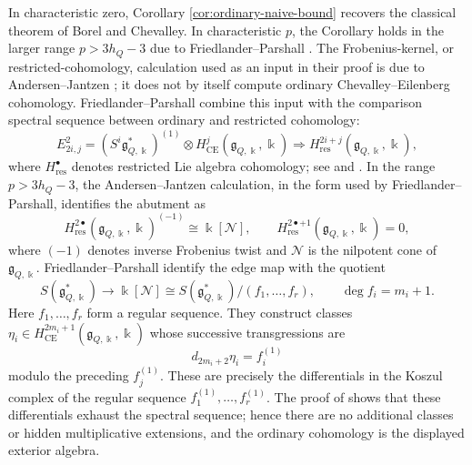 \documentclass[12pt]{amsart}
\theoremstyle{remark}
\newcommand{\kk}{\Bbbk}
\newcommand{\g}{\mathfrak g}
\newcommand{\CE}{\mathrm{CE}}
\begin{document}
In characteristic zero, Corollary 
\ref{cor:ordinary-naive-bound} recovers the classical theorem of Borel and Chevalley.
In characteristic $p$, the Corollary holds in the larger range $p>3h_Q-3$ due to
Friedlander--Parshall \cite[Theorem~1.2]{FP86}. The
Frobenius-kernel, or restricted-cohomology, calculation used as an input in
their proof is due to Andersen--Jantzen
\cite[Corollary~3.7]{AJ84}; it does not by itself compute ordinary
Chevalley--Eilenberg cohomology.  Friedlander--Parshall combine this input
with the comparison spectral sequence between ordinary and restricted
cohomology:
\[
 E^2_{2i,j}=(S^i\g_{Q,\kk}^*)^{(1)}
 \otimes H^j_{\CE}(\g_{Q,\kk},\kk)
 \Longrightarrow H^{2i+j}_{\mathrm{res}}(\g_{Q,\kk},\kk),
\]
where $H^\bullet_{\mathrm{res}}$ denotes restricted Lie algebra cohomology; see \cite[p.~1079]{FP88} and \cite[p.~114]{Far91}.
In the range $p>3h_Q-3$, the Andersen--Jantzen calculation, in the form used
by Friedlander--Parshall, identifies the abutment as
\[
 H^{2\bullet}_{\mathrm{res}}(\g_{Q,\kk},\kk)^{(-1)}
 \cong\kk[\mathcal N],
 \qquad H^{2\bullet+1}_{\mathrm{res}}(\g_{Q,\kk},\kk)=0,
\]
where $(-1)$ denotes inverse Frobenius twist and $\mathcal N$ is the nilpotent cone of $\g_{Q,\kk}$.
Friedlander--Parshall identify the edge map with the quotient
\[
 S(\g_{Q,\kk}^*)\longrightarrow
 \kk[\mathcal N]
 \cong S(\g_{Q,\kk}^*)/(f_1,\dots,f_r),
 \qquad \deg f_i=m_i+1.
\]
Here $f_1,\dots,f_r$ form a regular sequence.  They construct classes
$\eta_i\in H^{2m_i+1}_{\CE}(\g_{Q,\kk},\kk)$ whose successive
transgressions are
\[
 d_{2m_i+2}\eta_i=f_i^{(1)}
\]
modulo the preceding $f_j^{(1)}$.  These are precisely the differentials in
the Koszul complex of the regular sequence
$f_1^{(1)},\dots,f_r^{(1)}$.  The proof of
\cite[Theorem~1.2]{FP86} shows that these differentials exhaust the spectral
sequence; hence there are no additional classes or hidden multiplicative
extensions, and the ordinary cohomology is the displayed exterior algebra.
\end{document}
